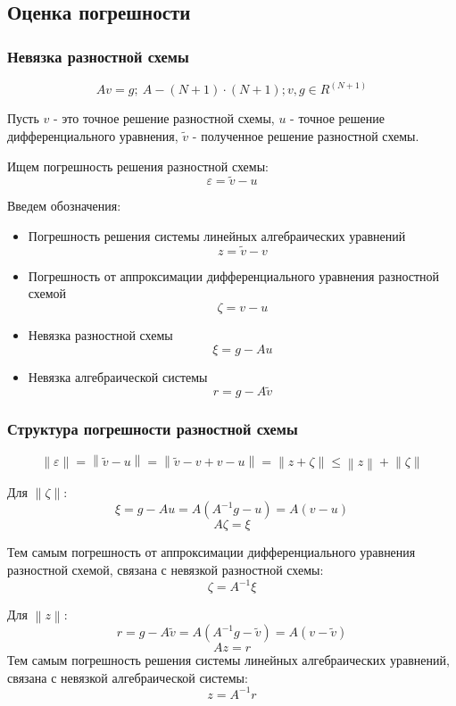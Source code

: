 \subsection{Оценка погрешности}

\subsubsection{Невязка разностной схемы}

\[
  Av = g;\ A - (N + 1) \cdot (N + 1); v, g \in R^{(N + 1)}
\]

Пусть $ v $ - это точное решение разностной схемы, $ u $ -  точное решение дифференциального уравнения, 
$ \tilde{v} $ - полученное решение разностной схемы.

Ищем погрешность решения разностной схемы:
\[
  \varepsilon = \tilde{v} - u
\]

Введем обозначения:
\begin{itemize}
  \item Погрешность решения системы линейных алгебраических уравнений
  \[ z = \tilde{v} - v \]
  \item Погрешность от аппроксимации дифференциального уравнения разностной схемой
  \[ \zeta = v - u \]
  \item Невязка разностной схемы
  \[ \xi = g - Au \]
  \item Невязка алгебраической системы
  \[ r = g - A\tilde{v} \]
\end{itemize}

\subsubsection{Структура погрешности разностной схемы}
\[
  \left\lVert \varepsilon \right\rVert = \left\lVert \tilde{v} - u \right\rVert =
  \left\lVert \tilde{v} - v + v - u \right\rVert = \left\lVert z + \zeta  \right\rVert \leq \left\lVert z \right\rVert
  + \left\lVert \zeta \right\rVert 
\]

Для $\left\lVert \zeta\right\rVert$:
\[
  \xi = g - Au = A(A^{-1}g - u) = A(v - u)
\]
\[
  A\zeta  = \xi
\]

Тем самым погрешность от аппроксимации дифференциального уравнения разностной схемой, связана с невязкой разностной схемы:
\[
  \zeta = A^{-1} \xi 
\]

Для $\left\lVert z \right\rVert$:
\[
  r = g - A\tilde{v} = A(A^{-1}g - \tilde{v}) = A(v - \tilde{v})
\]
\[
  Az = r
\]
Тем самым погрешность решения системы линейных алгебраических уравнений, связана с невязкой алгебраической системы:
\[
  z = A^{-1}r
\]

